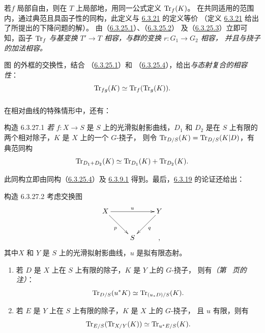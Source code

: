 若\pageoriginale $f$ 局部自由，则在 $T$ 上局部地，用同一公式定义 $\operatorname{Tr}_{f}(K)$。
在共同适用的范围内，通过典范且具函子性的同构，此定义与
\hyperref[XVII.prop6.3.21]{6.3.21} 的定义等价
（定义 \hyperref[XVII.prop6.3.21]{6.3.21} 给出了所提出的下降问题的解）。
由（\hyperref[XVII.par6.3.25.1]{6.3.25.1}）、（\hyperref[XVII.par6.3.25.2]{6.3.25.2}）
及（\hyperref[XVII.par6.3.25.3]{6.3.25.3}）立即可知，函子 $\operatorname{Tr}_{f}$
\emph{与基变换 $T'\rightarrow T$ 相容，与群的变换 $r:G_{1}\rightarrow G_{2}$ 相容，
并且与挠子的加法相容。}

图  的外框的交换性，结合
（\hyperref[XVII.par6.3.25.1]{6.3.25.1}）和
（\hyperref[XVII.par6.3.25.4]{6.3.25.4}），给出\emph{与态射复合的相容性}：
$$
\operatorname{Tr}_{fg}(K)\simeq \operatorname{Tr}_{f}(\operatorname{Tr}_{g}(K)){}.
$$

\subsubsection{}
在相对曲线的特殊情形中，还有：

\begin{enonce*}{构造 6.3.27.1}
\emph{若} $f:X\rightarrow S$ 是 $S$ 上的光滑拟射影曲线，$D_{1}$ 和 $D_{2}$
是在 $S$ 上有限的两个相对除子，$K$ 是 $X$ 上的一个 $G$-挠子，
则令 $\operatorname{Tr}_{D/S}(K)=\operatorname{Tr}_{D/S}(K|D)$，有典范同构
$$
\operatorname{Tr}_{D_{1}+D_{2}}(K)\simeq \operatorname{Tr}_{D_{1}}(K)+\operatorname{Tr}_{D_{2}}(K){}.
$$
\end{enonce*}

\sisi{\noindent}{}%
此同构立即由同构（\hyperref[XVII.par6.3.25.4]{6.3.25.4}）及
\hyperref[XVII.lem6.3.9.1]{6.3.9.1} 得到。最后，\hyperref[XVII.prop6.3.19]{6.3.19}
的论证还给出：

\begin{enonce*}{构造 6.3.27.2}
考虑交换图
$$
\xymatrix{
X   \ar[rr]^{u} \ar[rd]_{p}&     &  Y \ar[ld]^{q}\\
     &   S &,
}
$$
其中\pageoriginale $X$ 和 $Y$ 是 $S$ 上的光滑拟射影曲线，$u$ 是拟有限态射。
\begin{enumerate}
\renewcommand{\theenumi}{\roman{enumi}}
\renewcommand{\labelenumi}{(\theenumi)}
\item 若 $D$ 是 $X$ 上在 $S$ 上有限的除子，$K$ 是 $Y$ 上的 $G$-挠子，
则有\emph{（\cf 第~\pageref{XVII.note192} 页的注）}：
$$
\operatorname{Tr}_{D/S}(u^{\ast}K)\simeq \operatorname{Tr}_{(u_{\ast}D)/S}(K){}.
$$

\item 若 $E$ 是 $Y$ 上在 $S$ 上有限的除子，$K$ 是 $X$ 上的 $G$-挠子，
且 $u$ 有限，则有
$$
\operatorname{Tr}_{E/S}(\operatorname{Tr}_{X/Y}(K))\simeq \operatorname{Tr}_{u^{\ast}E/S}(K){}.
$$
\end{enumerate}
\end{enonce*}

